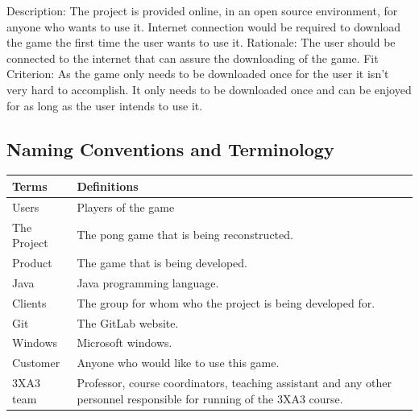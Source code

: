 \documentclass[12pt,letterpaper]{article}
\begin{document}
\noindent Description: The project is provided online, in an open source environment, for anyone who wants to use it. Internet connection would be required to download the game the first time the user wants to use it.
Rationale: The user should be connected to the internet that can assure the downloading of the game.
Fit Criterion: As the game only needs to be downloaded once for the user it isn’t very hard to accomplish. It only needs to be downloaded once and can be enjoyed for as long as the user intends to use it.
	
\subsection{Naming Conventions and Terminology}
\begin{tabular}{|p{3cm}|p{8cm}|}
\hline
\textbf{Terms}    & \textbf{Definitions}                                                                                                                                                                                                                                                                                                                                                                                                                                \\\hline
Users &                                                                                                                                                                                            Players of the game \\\hline
The Project  & The pong game that is being reconstructed. \\\hline
Product       & The game that is being developed.
 \\\hline
Java            & Java programming language.
 \\\hline
Clients          & 	The group for whom who the project is being developed for.
 \\\hline
Git        & The GitLab website.
 \\\hline
Windows       & Microsoft windows.
 \\\hline
Customer         & Anyone who would like to use this game.
 \\\hline
3XA3 team        & Professor, course coordinators, teaching assistant and any other personnel responsible for running of the 3XA3 course.
 \\\hline
\end{tabular}
\end{document}
